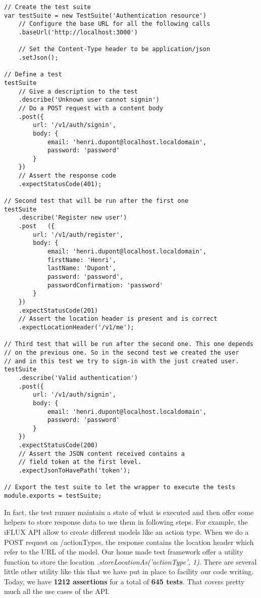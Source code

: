 \begin{lstlisting}
// Create the test suite
var testSuite = new TestSuite('Authentication resource')
	// Configure the base URL for all the following calls
	.baseUrl('http://localhost:3000')
	
	// Set the Content-Type header to be application/json
	.setJson();

// Define a test
testSuite
	// Give a description to the test
	.describe('Unknown user cannot signin')
	// Do a POST request with a content body
	.post({
		url: '/v1/auth/signin',
		body: {
			email: 'henri.dupont@localhost.localdomain',
			password: 'password'
		}
	})
	// Assert the response code
	.expectStatusCode(401);

// Second test that will be run after the first one
testSuite
	.describe('Register new user')
	.post	({
		url: '/v1/auth/register',
		body: {
			email: 'henri.dupont@localhost.localdomain',
			firstName: 'Henri',
			lastName: 'Dupont',
			password: 'password',
			passwordConfirmation: 'password'
		}
	})
	.expectStatusCode(201)
	// Assert the location header is present and is correct
	.expectLocationHeader('/v1/me');

// Third test that will be run after the second one. This one depends
// on the previous one. So in the second test we created the user
// and in this test we try to sign-in with the just created user.
testSuite
	.describe('Valid authentication')
	.post({
		url: '/v1/auth/signin',
		body: {
			email: 'henri.dupont@localhost.localdomain',
			password: 'password'
		}
	})
	.expectStatusCode(200)
	// Assert the JSON content received contains a 
	// field token at the first level.
	.expectJsonToHavePath('token');

// Export the test suite to let the wrapper to execute the tests
module.exports = testSuite;
\end{lstlisting}

In fact, the test runner maintain a state of what is executed and then offer some helpers to store response data to use them in following steps. For example, the iFLUX API allow to create different models like an action type. When we do a POST request on /actionTypes, the response contains the location header which refer to the URL of the model. Our home made test framework offer a utility function to store the location \emph{.storeLocationAs('actionType', 1)}. There are several little other utility like this that we have put in place to facility our code writing. Today, we have \textbf{1212 assertions} for a total of \textbf{645 tests}. That covers pretty much all the use cases of the API.